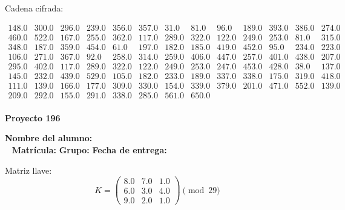 \documentclass[12pt]{article}
\begin{document}
Cadena cifrada:
\begin{center}
$\begin{array}{lllllllllllll}
148.0 & 300.0 & 296.0 & 239.0 & 356.0 & 357.0 & 31.0 & 81.0 & 96.0 & 189.0 & 393.0 & 386.0 & 274.0\\
460.0 & 522.0 & 167.0 & 255.0 & 362.0 & 117.0 & 289.0 & 322.0 & 122.0 & 249.0 & 253.0 & 81.0 & 315.0\\
348.0 & 187.0 & 359.0 & 454.0 & 61.0 & 197.0 & 182.0 & 185.0 & 419.0 & 452.0 & 95.0 & 234.0 & 223.0\\
106.0 & 271.0 & 367.0 & 92.0 & 258.0 & 314.0 & 259.0 & 406.0 & 447.0 & 257.0 & 401.0 & 438.0 & 207.0\\
295.0 & 402.0 & 117.0 & 289.0 & 322.0 & 122.0 & 249.0 & 253.0 & 247.0 & 453.0 & 428.0 & 38.0 & 137.0\\
145.0 & 232.0 & 439.0 & 529.0 & 105.0 & 182.0 & 233.0 & 189.0 & 337.0 & 338.0 & 175.0 & 319.0 & 418.0\\
111.0 & 139.0 & 166.0 & 177.0 & 309.0 & 330.0 & 154.0 & 339.0 & 379.0 & 201.0 & 471.0 & 552.0 & 139.0\\
209.0 & 292.0 & 155.0 & 291.0 & 338.0 & 285.0 & 561.0 & 650.0\\
\end{array}$
\end{center}

\newpage


\textbf{Proyecto 196}

\textbf{Nombre del alumno:} \underline{\hspace{13cm}}\\\
\vspace{1cm}
\textbf{Matrícula:} \underline{\hspace{4cm}} \hspace{1cm}
\textbf{Grupo:} \underline{\hspace{2cm}}
\textbf{Fecha de entrega:} \underline{\hspace{2cm}}

\medskip

Matriz llave:
\[
K = \begin{pmatrix}
8.0 & 7.0 & 1.0\\
6.0 & 3.0 & 4.0\\
9.0 & 2.0 & 1.0
\end{pmatrix} \pmod{29}
\]
\end{document}
